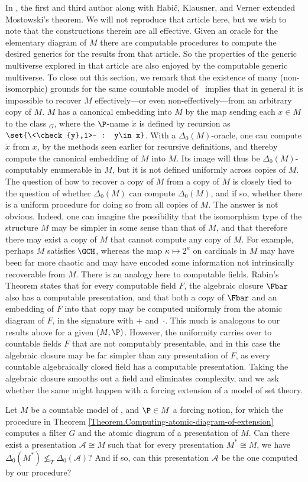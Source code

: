 \documentclass{amsart}
\newcommand{\xcheck}{\check{x}}
\newcommand{\ycheck}{\check{y}}
\begin{document}
In \cite{HHKVW2019}, the first and third author along with Habi\v{c}, Klausner, and Verner extended Mostowski's theorem. We will not reproduce that article here, but we wish to note that the constructions therein are all effective. Given an oracle for the elementary diagram of $M$ there are computable procedures to compute the desired generics for the results from that article. So the properties of the generic multiverse explored in that article are also enjoyed by the computable generic multiverse.
\smallskip
To close out this section, we remark that the existence of many (non-isomorphic) grounds for the same countable
model of \ZFC\ implies that in general it is impossible to recover $M$ effectively---or even non-effectively---from an arbitrary copy of $M$.
$M$ has a canonical embedding into $M$
by the map sending each $x\in M$ to the class $_G$, where the $\P$-name
$\xcheck$ is defined by recursion as $\set{\<\ycheck,1>~ : y\in x}$.
With a
$\Delta_0(M)$-oracle, one can compute $\xcheck$ from $x$, by the methods
seen earlier for recursive definitions,
and thereby compute the canonical embedding of $M$ into $M$.
Its image will thus be $\Delta_0(M)$-computably enumerable in $M$,
but it is not defined uniformly across copies of $M$.
The question of how to recover a copy of $M$
from a copy of $M$ is closely tied to the question of whether
$\Delta_0(M)$ can compute $\Delta_0(M)$, and if so, whether there
is a uniform procedure for doing so from all copies of $M$.
The answer is not obvious.
Indeed, one can imagine the possibility that the isomorphism type of the structure
$M$ may be simpler in some sense than that of $M$, and that therefore
there may exist a copy of $M$ that cannot compute any copy of $M$.
For example, perhaps $M$ satisfies $\GCH$, whereas the map
$\kappa\mapsto 2^{\kappa}$ on cardinals in $M$ may have been far more
chaotic and may have encoded some information not intrinsically recoverable
from $M$.
There is an analogy here to computable fields.
Rabin's Theorem states that for
every computable field $F$, the algebraic closure $\Fbar$ also has a computable
presentation, and that both a copy of $\Fbar$ and an embedding of $F$ into that copy
may be computed uniformly from the atomic diagram of $F$, in the signature
with $+$ and~$\cdot$.
This much is analogous to our results above for a given
$(M,\P)$.
However, the uniformity carries over to countable fields $F$ that
are not computably presentable, and in this case the algebraic closure may be
far simpler than any presentation of $F$, as every countable algebraically closed field
has a computable presentation.
Taking the algebraic closure smooths out a field
and eliminates complexity, and we ask whether the same might happen with a forcing extension of a model of set theory.
\begin{question}
Let $M$ be a countable model of \ZFC, and $\P\in M$ a forcing notion, for which the
procedure in Theorem
\ref{Theorem.Computing-atomic-diagram-of-extension} computes
a filter $G$ and the atomic diagram of a presentation of $M$.
Can there exist a
presentation $\mathcal A\cong M$ such that for every presentation ${M^*} \cong M$, we have $\Delta_0({M^*}) \not \leq_T \Delta_0(\mathcal A)$?
And if so, can this presentation $\mathcal A$ be the one computed by our procedure?
\end{question}
\end{document}
